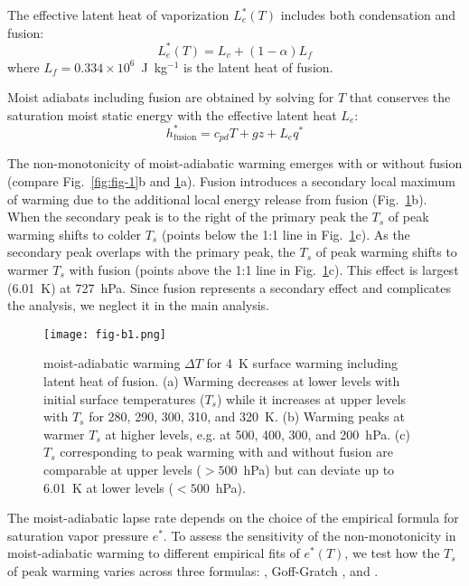 \documentclass[]{ametsocV6.1}
\begin{document}
The effective latent heat of vaporization $L_e^*(T)$ includes both condensation and fusion:
\begin{equation}
L_e^*(T) = L_v + (1-\alpha) L_f
\end{equation}
where $L_f = 0.334 \times 10^6$~J~kg$^{-1}$ is the latent heat of fusion.

Moist adiabats including fusion are obtained by solving for $T$ that conserves the saturation moist static energy with the effective latent heat $L_e$:
\begin{equation}
    h_\mathrm{fusion}^* = c_{pd}T + gz + L_e q^*  \label{eq:mse_fusion}
\end{equation}

The non-monotonicity of moist-adiabatic warming emerges with or without fusion (compare Fig.~\ref{fig:fig-1}b and \ref{fig:fig-b1}a). Fusion introduces a secondary local maximum of warming due to the additional local energy release from fusion (Fig.~\ref{fig:fig-b1}b). When the secondary peak is to the right of the primary peak the $T_s$ of peak warming shifts to colder $T_s$ (points below the 1:1 line in Fig.~\ref{fig:fig-b1}c). As the secondary peak overlaps with the primary peak, the $T_s$ of peak warming shifts to warmer $T_s$ with fusion (points above the 1:1 line in Fig.~\ref{fig:fig-b1}c). This effect is largest (6.01~K) at 727~hPa. Since fusion represents a secondary effect and complicates the analysis, we neglect it in the main analysis.

\begin{figure}[htbp]
 \centering
 \texttt{[image: fig-b1.png]}
 \caption{moist-adiabatic warming $\Delta T$ for 4~K surface warming including latent heat of fusion. (a) Warming decreases at lower levels with initial surface temperatures ($T_s$) while it increases at upper levels with $T_s$ for 280, 290, 300, 310, and 320~K. (b) Warming peaks at warmer $T_s$ at higher levels, e.g. at 500, 400, 300, and 200~hPa. (c) $T_s$ corresponding to peak warming with and without fusion are comparable at upper levels ($>500$~hPa) but can deviate up to 6.01~K at lower levels ($<500$~hPa).}\label{fig:fig-b1}
\end{figure}

\appendix[C] 
\label{app:svp}
The moist-adiabatic lapse rate depends on the choice of the empirical formula for saturation vapor pressure $e^*$. To assess the sensitivity of the non-monotonicity in moist-adiabatic warming to different empirical fits of $e^*(T)$, we test how the $T_s$ of peak warming varies across three formulas: \cite{bolton1980}, Goff-Gratch \citep[as described in][]{list1949}, and \cite{murphy2005}.
\end{document}
